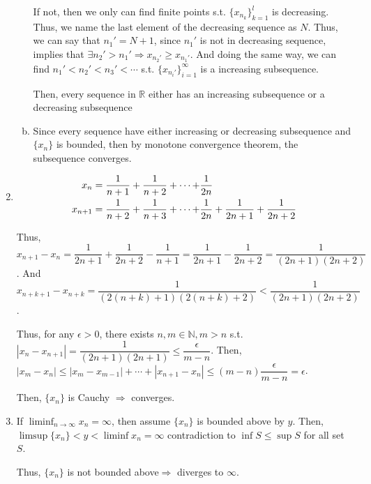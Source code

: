\documentclass[12pt]{article}
\begin{document}
\begin{enumerate}
\begin{enumerate}[(a)]
        If not, then we only can find finite points s.t. $\lbrace x_{n_k}\rbrace_{k=1}^l$ is decreasing. Thus, we name the last element of the decreasing sequence as $N$.
        Thus, we can say that $n_1' = N + 1$, since $n_1'$ is not in decreasing sequence, implies that $\exists n_2' > n_1' \Rightarrow x_{n_2'} \geq x_{n_1'}$.
        And doing the same way,  we can find $n_1' < n_2' < n_3' < \cdots$ s.t. $\lbrace x_{n_i'}\rbrace_{i=1}^\infty$ is a increasing subsequence.

        Then, every sequence in $\mathbb{R}$ either has an increasing subsequence or a decreasing subsequence

        \item Since every sequence have either increasing or decreasing subsequence and $\lbrace x_n \rbrace$ is bounded,
        then by monotone convergence theorem, the subsequence converges.
    \end{enumerate} 
    
    \newpage
    \item \begin{align*}
        x_n = \dfrac{1}{n+1} + \dfrac{1}{n+2} + \cdots + &\dfrac{1}{2n}
        \notag
        \\x_{n+1} = \dfrac{1}{n+2} + \dfrac{1}{n+3} + \cdots + &\dfrac{1}{2n} + \dfrac{1}{2n+1} + \dfrac{1}{2n+2}
    \end{align*}

    Thus, $x_{n+1} - x_n = \dfrac{1}{2n+1} + \dfrac{1}{2n+2} - \dfrac{1}{n+1} = \dfrac{1}{2n+1} - \dfrac{1}{2n+2} = \dfrac{1}{(2n+1)(2n+2)}$.
    And $x_{n+k+1} - x_{n+k} = \dfrac{1}{(2(n+k)+1)(2(n+k)+2)} < \dfrac{1}{(2n+1)(2n+2)}$.

    Thus, for any $\epsilon > 0$, there exists $n, m \in \mathbb{N}, m>n$ s.t. $|x_{n} - x_{n+1}| = \dfrac{1}{(2n+1)(2n+1)} \leq \dfrac{\epsilon}{m-n}$.
    Then, $|x_{m} - x_n| \leq |x_m - x_{m-1}| + \cdots + |x_{n+1} - x_n| \leq (m-n) \dfrac{\epsilon}{m-n} = \epsilon$.

    Then, $\lbrace x_n\rbrace$ is Cauchy $\Rightarrow$ converges. 

    \item If $\displaystyle\liminf_{n \to \infty} x_n = \infty$, then assume $\lbrace x_n\rbrace$ is bounded above by $y$.
    Then, $\limsup \lbrace x_n\rbrace < y < \liminf x_n = \infty$ contradiction to $\inf S \leq \sup S$ for all set $S$.

    Thus, $\lbrace x_n \rbrace$ is not bounded above$\Rightarrow$ diverges to $\infty$.
\end{enumerate}
\end{document}
